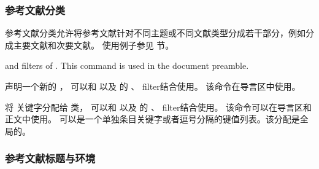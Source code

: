 \subsubsection{参考文献分类}%
\label{use:bib:cat}


参考文献分类允许将参考文献针对不同主题或不同文献类型分成若干部分，例如分成主要文献和次要文献。
使用例子参见  节。

\begin{ltxsyntax}


 and  filters of . This command is used in the document preamble.

声明一个新的 ，
可以和  以及  的 、 filter结合使用。
该命令在导言区中使用。



将  关键字分配给  类，
可以和  以及  的 、 filter结合使用。
该命令可以在导言区和正文中使用。
 可以是一个单独条目关键字或者逗号分隔的键值列表。该分配是全局的。

\end{ltxsyntax}

\subsubsection{参考文献标题与环境}%
\label{use:bib:hdg}

